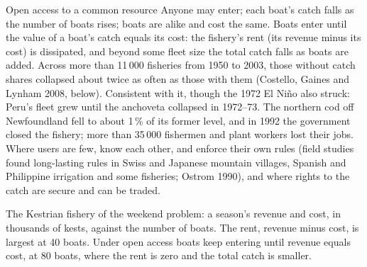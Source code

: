 \begin{model}{Open access to a common resource}
\assumes Anyone may enter; each boat's catch falls as the number of boats rises; boats are alike and cost the same.
\predicts Boats enter until the value of a boat's catch equals its cost: the fishery's rent (its revenue minus its cost) is dissipated, and beyond some fleet size
  the total catch falls as boats are added.
\tested Across more than 11\,000 fisheries from 1950 to 2003, those without catch shares collapsed about twice as often as those with them
  (Costello, Gaines and Lynham 2008, below). Consistent with it, though the 1972 El Niño also struck: Peru's fleet grew until the anchoveta collapsed in
  1972--73. The northern cod off Newfoundland fell to about 1\,\% of its former level, and in 1992 the government closed the fishery; more than
  35\,000 fishermen and plant workers lost their jobs.
\breaks Where users are few, know each other, and enforce their own rules (field studies found long-lasting rules in Swiss and Japanese mountain villages,
  Spanish and Philippine irrigation and some fisheries; Ostrom 1990), and where rights to the catch are secure and can be traded.
\end{model}

\begin{omfigure}

{\small The Kestrian fishery of the weekend problem: a season's revenue and cost, in thousands of kests, against the number of boats. The rent, revenue minus cost, is largest at 40 boats.
Under open access boats keep entering until revenue equals cost, at 80 boats, where the rent is zero and the total catch is smaller.}
\end{omfigure}

